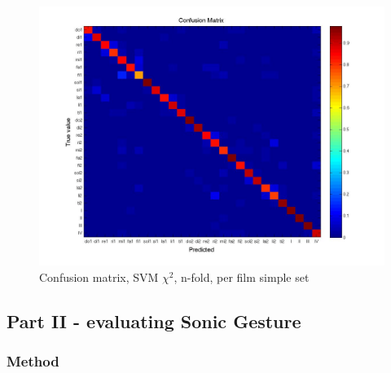 \begin{figure}[htbp]
	\centering{}
	\includegraphics[width=\linewidth]{confmat/confusion.jpg}
	\caption{Confusion matrix, SVM $\chi^2$, n-fold, per film simple set}
	\label{fig:confusion}
\end{figure}




\subsection{Part II - evaluating Sonic Gesture}

\subsubsection{Method}

